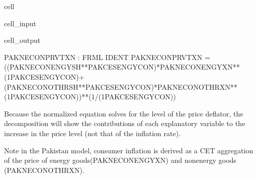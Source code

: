 \documentclass[letterpaper,10pt,english]{jupyterBook}
\begin{document}
\begin{sphinxuseclass}{cell}\begin{sphinxVerbatimInput}

\begin{sphinxuseclass}{cell_input}
\begin{sphinxVerbatim}[commandchars=\\\{\}]
\PYG{p}{[}\PYG{p}{]}
\end{sphinxVerbatim}

\end{sphinxuseclass}\end{sphinxVerbatimInput}
\begin{sphinxVerbatimOutput}

\begin{sphinxuseclass}{cell_output}
\begin{sphinxVerbatim}[commandchars=\\\{\}]
PAKNECONPRVTXN : FRML \PYGZlt{}IDENT\PYGZgt{} PAKNECONPRVTXN = ((PAKNECONENGYSH**PAKCESENGYCON)*PAKNECONENGYXN**(1\PYGZhy{}PAKCESENGYCON)+(PAKNECONOTHRSH**PAKCESENGYCON)*PAKNECONOTHRXN**(1\PYGZhy{}PAKCESENGYCON))**(1/(1\PYGZhy{}PAKCESENGYCON)) \PYGZdl{}
\end{sphinxVerbatim}

\end{sphinxuseclass}\end{sphinxVerbatimOutput}

\end{sphinxuseclass}
\sphinxAtStartPar
Because the normalized equation solves for the level of the price deflator, the decomposition will show the contributions of each explanatory variable to the increase in the price level (not that of the inflation rate).

\sphinxAtStartPar
Note in the Pakistan model, consumer inflation is derived as a CET aggregation of the price of energy goods(PAKNECONENGYXN) and non\sphinxhyphen{}energy goods (PAKNECONOTHRXN).
\end{document}
